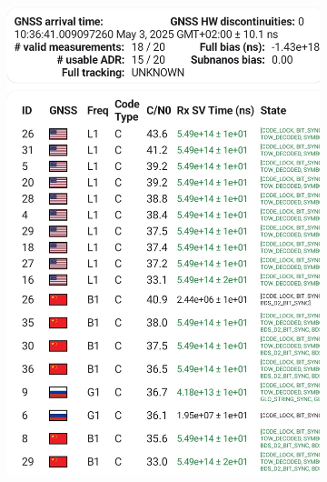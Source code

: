         \begin{figure}[htbp]
            \centering
            \begin{subfigure}{0.23\textwidth}
                \centering
                \includegraphics[width=\textwidth]{images/screenshots/Screenshot_20250503_GnssLogger_measurements.jpg}
                \label{fig:gnsslogger_measurements}
            \end{subfigure}
            \hfill
            \begin{subfigure}{0.23\textwidth}
                \centering

\end{subfigure}
\end{figure}
